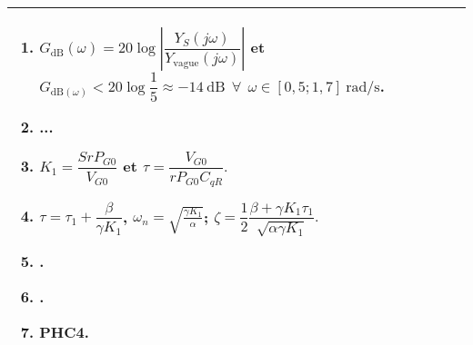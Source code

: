 \begin{multicols}{2}
%
%
%
%
%
%
%
%
%
%
%

\ifprof
\else
\ifcolle
\else
\begin{tabular}{|p{.95\linewidth}|}
\hline
\begin{enumerate}
\item  $G_{\text{dB}}(\omega)=20\log \left \vert \dfrac{Y_S(j\omega)}{Y_{\text{vague}}(j\omega)}\right \vert$ et 
$G_{\text{dB}(\omega)}<20 \log \dfrac{1}{5}\approx - 14 \ \text{dB} \ \ \forall \ \ \omega\in[0,5;1,7]  \ \text{rad/s}$.
\item ...
\item $K_1=\dfrac{SrP_{G0}}{V_{G0}}$ et $\tau=\dfrac{V_{G0}}{rP_{G0}C_{qR}}.$
\item $\tau=\tau_1+\dfrac{\beta}{\gamma K_1}$, $\omega_n=\sqrt{\frac{\gamma K_1}{\alpha}}$; $\zeta=\dfrac{1}{2}\dfrac{\beta+\gamma K_1 \tau_1}{\sqrt{\alpha \gamma K_1}}.$
\item .
\item .
\item PHC4.
\end{enumerate}\\
\hline
\end{tabular}
\fi %
\fi
\ifprof
\else
\end{multicols}
\fi
